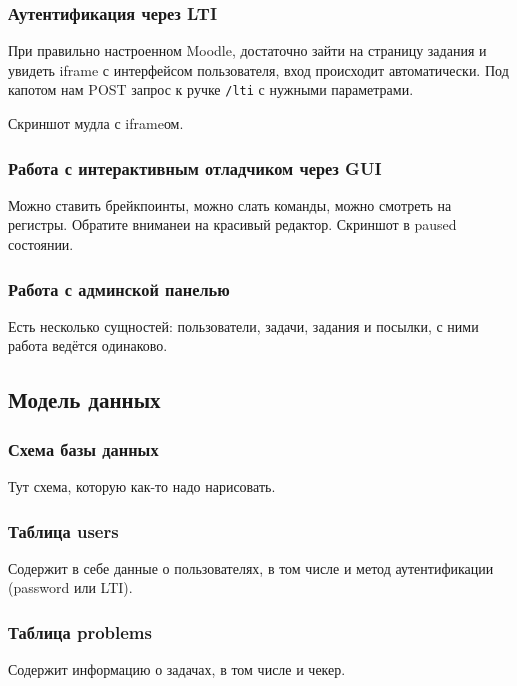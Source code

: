 \documentclass[a4paper,article,14pt]{extarticle}
\begin{document}
\subsubsection{Аутентификация через LTI}

При правильно настроенном Moodle, достаточно зайти на страницу задания и увидеть iframe с интерфейсом пользователя, вход происходит автоматически. Под капотом нам POST запрос к ручке \texttt{/lti} с нужными параметрами.

Скриншот мудла с iframeом.

\subsubsection{Работа с интерактивным отладчиком через GUI}

Можно ставить брейкпоинты, можно слать команды, можно смотреть на регистры. Обратите вниманеи на красивый редактор. Скриншот в paused состоянии.

\subsubsection{Работа с админской панелью}

Есть несколько сущностей: пользователи, задачи, задания и посылки, с ними работа ведётся одинаково.

\subsection{Модель данных}

\subsubsection{Схема базы данных}

Тут схема, которую как-то надо нарисовать.

\subsubsection{Таблица users}

Содержит в себе данные о пользователях, в том числе и метод аутентификации (password или LTI).

\subsubsection{Таблица problems}

Содержит информацию о задачах, в том числе и чекер.
\end{document}
